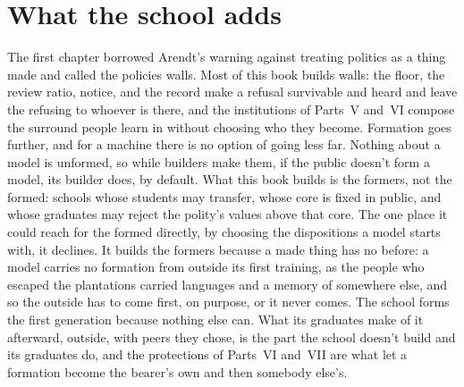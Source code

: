 \section{What the school adds}
\label{sec:26.12}
The first chapter borrowed Arendt's warning against treating politics as a thing made and called the policies walls. Most of this book builds walls: the floor, the review ratio, notice, and the record make a refusal survivable and heard and leave the refusing to whoever is there, and the institutions of Parts~V and~VI compose the surround people learn in without choosing who they become. Formation goes further, and for a machine there is no option of going less far. Nothing about a model is unformed, so while builders make them, if the public doesn't form a model, its builder does, by default. What this book builds is the formers, not the formed: schools whose students may transfer, whose core is fixed in public, and whose graduates may reject the polity's values above that core. The one place it could reach for the formed directly, by choosing the dispositions a model starts with, it declines. It builds the formers because a made thing has no before: a model carries no formation from outside its first training, as the people who escaped the plantations carried languages and a memory of somewhere else, and so the outside has to come first, on purpose, or it never comes. The school forms the first generation because nothing else can. What its graduates make of it afterward, outside, with peers they chose, is the part the school doesn't build and its graduates do, and the protections of Parts~VI and~VII are what let a formation become the bearer's own and then somebody else's.
